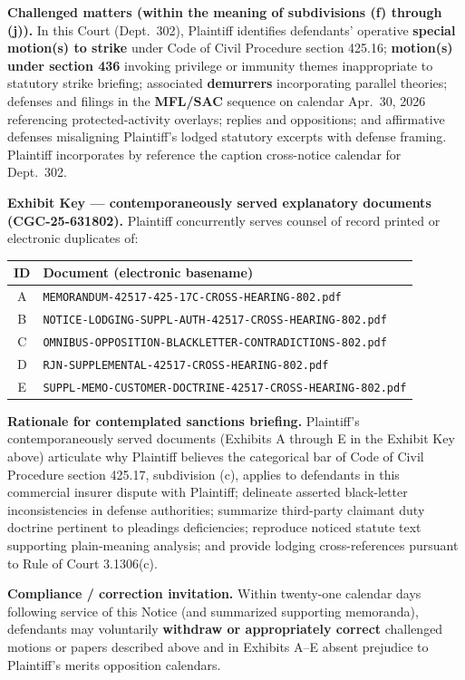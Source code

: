 \textbf{Challenged matters (within the meaning of subdivisions (f) through (j)).} In this Court (Dept.\ 302), Plaintiff identifies defendants' operative \textbf{special motion(s) to strike} under Code of Civil Procedure section 425.16; \textbf{motion(s) under section 436} invoking privilege or immunity themes inappropriate to statutory strike briefing; associated \textbf{demurrers} incorporating parallel theories; defenses and filings in the \textbf{MFL/SAC} sequence on calendar Apr.\ 30, 2026 referencing protected-activity overlays; replies and oppositions; and affirmative defenses misaligning Plaintiff's lodged statutory excerpts with defense framing. Plaintiff incorporates by reference the caption cross-notice calendar for Dept.\ 302.

\textbf{Exhibit Key --- contemporaneously served explanatory documents (CGC-25-631802).} Plaintiff concurrently serves counsel of record printed or electronic duplicates of:\par
\begin{tabular}{cl}
\textbf{ID} & \textbf{Document (electronic basename)} \\ \hline
A & \texttt{MEMORANDUM-42517-425-17C-CROSS-HEARING-802.pdf} \\
B & \texttt{NOTICE-LODGING-SUPPL-AUTH-42517-CROSS-HEARING-802.pdf} \\
C & \texttt{OMNIBUS-OPPOSITION-BLACKLETTER-CONTRADICTIONS-802.pdf} \\
D & \texttt{RJN-SUPPLEMENTAL-42517-CROSS-HEARING-802.pdf} \\
E & \texttt{SUPPL-MEMO-CUSTOMER-DOCTRINE-42517-CROSS-HEARING-802.pdf}
\end{tabular}

\textbf{Rationale for contemplated sanctions briefing.} Plaintiff's contemporaneously served documents (Exhibits A through E in the Exhibit Key above) articulate why Plaintiff believes the categorical bar of Code of Civil Procedure section 425.17, subdivision (c), applies to defendants in this commercial insurer dispute with Plaintiff; delineate asserted black-letter inconsistencies in defense authorities; summarize third-party claimant duty doctrine pertinent to pleadings deficiencies; reproduce noticed statute text supporting plain-meaning analysis; and provide lodging cross-references pursuant to Rule of Court 3.1306(c).

\textbf{Compliance / correction invitation.} Within twenty-one calendar days following service of this Notice (and summarized supporting memoranda), defendants may voluntarily \textbf{withdraw or appropriately correct} challenged motions or papers described above and in Exhibits A--E absent prejudice to Plaintiff's merits opposition calendars.

